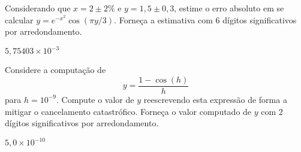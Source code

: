 \begin{exer}\label{exer:properro_abs2}
  Considerando que $x=2\pm 2\%$ e $y=1,5\pm 0,3$, estime o erro absoluto em se calcular $y = e^{-x^2}\cos(\pi y/3)$. Forneça a estimativa com $6$ dígitos significativos por arredondamento.
\end{exer}
\begin{resp}
  $5,75403\times 10^{-3}$
\end{resp}

\begin{exer}\label{exer:cancela_1}
  Considere a computação de
  \begin{equation}
    y = \frac{1 - \cos(h)}{h}
  \end{equation}
para $h=10^{-9}$. Compute o valor de $y$ reescrevendo esta expressão de forma a mitigar o cancelamento catastrófico. Forneça o valor computado de $y$ com $2$ dígitos significativos por arredondamento.
\end{exer}
\begin{resp}
  $5,0\times 10^{-10}$
\end{resp}
